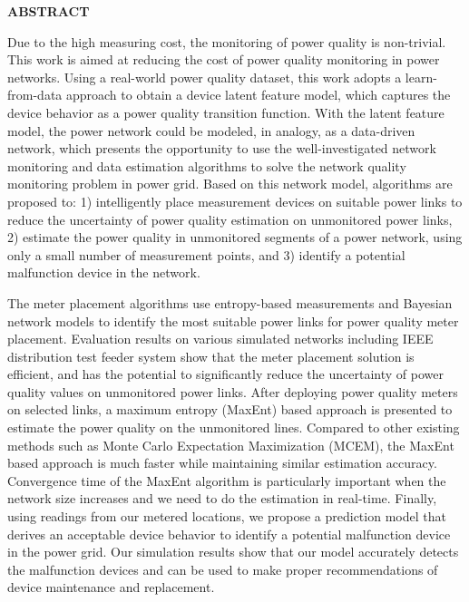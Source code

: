 \newpage
{}


\begin{center}
\textbf{ABSTRACT}
\end{center}

Due to the high measuring cost, the monitoring of power quality is non-trivial. This work is aimed at reducing the cost of power quality monitoring in power networks. Using a real-world power quality dataset, this work adopts a learn-from-data approach to obtain a device latent feature model, which captures the device behavior as a power quality transition function. With the latent feature model, the power network could be modeled, in analogy, as a data-driven network, which presents the opportunity to use the well-investigated network monitoring and data estimation algorithms to solve the network quality monitoring problem in power grid. Based on this network model, algorithms are proposed to: 1) intelligently place measurement devices on suitable power links to reduce the uncertainty of power quality estimation on unmonitored power links, 2) estimate the power quality in unmonitored segments of a power network, using only a small number of measurement points, and 3) identify a potential malfunction device in the network.

The meter placement algorithms use entropy-based measurements and Bayesian network models to identify the most suitable power links for power quality meter placement. Evaluation results on various simulated networks including IEEE distribution test feeder system show that the meter placement solution is efficient, and has the potential to significantly reduce the uncertainty of power quality values on unmonitored power links. After deploying power quality meters on selected links, a maximum entropy (MaxEnt) based approach is presented to estimate the power quality on the unmonitored lines. Compared to other existing methods such as Monte Carlo Expectation Maximization (MCEM), the MaxEnt based approach is much faster while maintaining similar estimation accuracy. Convergence time of the MaxEnt algorithm is particularly important when the network size increases and we need to do the estimation in real-time. Finally, using readings from our metered locations, we propose a prediction model that derives an acceptable device behavior to identify a potential malfunction device in the power grid. Our simulation results show that our model accurately detects the malfunction devices and can be used to make proper recommendations of device maintenance and replacement.